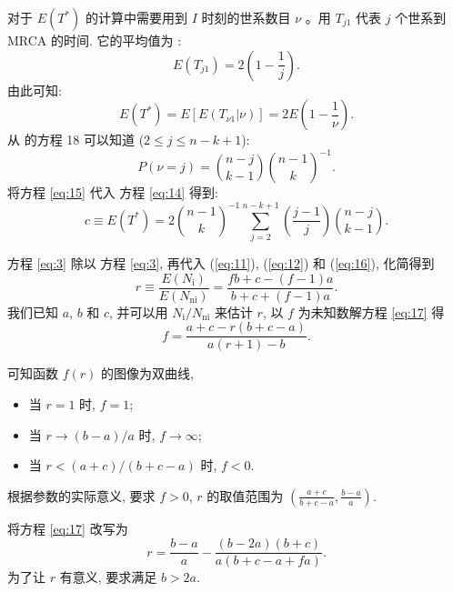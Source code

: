 \documentclass[12pt]{article}
\begin{document}
对于 $E(T^*)$ 的计算中需要用到 $I$ 时刻的世系数目 $\nu$ 。用 $T_{j1}$ 代表 $j$ 个世系到 MRCA 的时间.
它的平均值为 \parencite{kingman1982}:
\begin{equation} \label{eq:13}
    E(T_{j1}) = 2 \left( 1- \frac{1}{j}\right)
    \text{.}
\end{equation}
由此可知:
\begin{equation} \label{eq:14}
    E(T^*) = E[E(T_{\nu 1} | \nu)] =  2 E\left( 1- \frac{1}{\nu}\right)
    \text{.}
\end{equation}
从 \textcite{wiuf1999} 的方程 18 可以知道 ($2 \leq j \leq n-k+1$):
\begin{equation} \label{eq:15}
    P(\nu = j) = \binom{n-j}{k-1} \binom{n-1}{k}^{-1}
    \text{.}
\end{equation}
将方程 \ref{eq:15} 代入 方程 \ref{eq:14} 得到:
\begin{equation} \label{eq:16}
    c \equiv E(T^{*}) = 2 \binom{n-1}{k}^{-1} \sum_{j=2}^{n-k+1} \left(\frac{j-1}{j}\right) \binom{n-j}{k-1}
    \text{.}
\end{equation}

方程 \ref{eq:3} 除以 方程 \ref{eq:3}, 再代入 (\ref{eq:11}), (\ref{eq:12}) 和 (\ref{eq:16}), 化简得到
\begin{equation} \label{eq:17}
    r \equiv \frac{E(N_\text{i})}{E(N_\text{ni})}
    = \frac{fb+c-(f-1)a}{b+c+(f-1)a}
    \text{.}
\end{equation}
我们已知 $a$, $b$ 和 $c$, 并可以用 $N_\text{i} / N_\text{ni}$ 来估计 $r$, 以 $f$ 为未知数解方程 \ref{eq:17} 得
\begin{equation} \label{eq:18}
    f = \frac{a+c-r(b+c-a)}{a(r+1)-b}
    \text{.}
\end{equation}

可知函数 $f(r)$ 的图像为双曲线,
\begin{itemize}[leftmargin=4em]
    \item 当 $r = 1$ 时, $f = 1$;
    \item 当 $r \rightarrow (b-a)/a$ 时, $f \rightarrow \infty$;
    \item 当 $r < (a+c)/(b+c-a)$ 时, $f < 0$.
\end{itemize}
根据参数的实际意义, 要求 $f > 0$, $r$ 的取值范围为 $(\frac{a+c}{b+c-a}, \frac{b−a}{a})$.

将方程 \ref{eq:17} 改写为
\begin{equation} \label{eq:19}
    r = \frac{b-a}{a} - \frac{(b-2a)(b+c)}{a(b+c-a+fa)}
    \text{.}
\end{equation}
为了让 $r$ 有意义, 要求满足 $b > 2a$.
\end{document}
